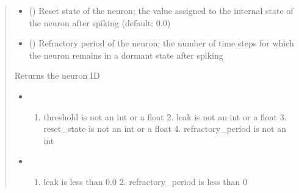 \documentclass[letterpaper,10pt,english]{sphinxmanual}
\begin{document}
\begin{fulllineitems}
\begin{fulllineitems}
\begin{quote}
\begin{description}
\begin{itemize}
\item {} 
\sphinxAtStartPar
{} () \textendash{} Reset state of the neuron; the value assigned to the internal state of the neuron after spiking (default: 0.0)

\item {} 
\sphinxAtStartPar
{} () \textendash{} Refractory period of the neuron; the number of time steps for which the neuron remains in a dormant state after spiking

\end{itemize}

\sphinxAtStartPar
Returns the neuron ID

\begin{itemize}
\item {} 
\sphinxAtStartPar
{} \textendash{} \begin{enumerate}
%
\item {} 
\sphinxAtStartPar
threshold is not an int or a float
    2. leak is not an int or a float
    3. reset\_state is not an int or a float
    4. refractory\_period is not an int

\end{enumerate}


\item {} 
\sphinxAtStartPar
{} \textendash{} \begin{enumerate}
%
\item {} 
\sphinxAtStartPar
leak is less than 0.0
    2. refractory\_period is less than 0

\end{enumerate}


\end{itemize}

\end{description}\end{quote}

\end{fulllineitems}



\end{fulllineitems}
\end{document}

